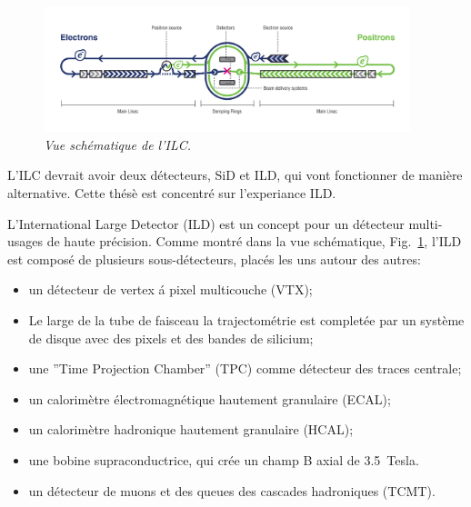 \begin{figure}
	{\centering
		\includegraphics[width=0.95\textwidth]{graphics/ILC_scheme.jpg}
		\caption{\sl Vue sch\'ematique de l'ILC.}
		\label{fig:ILCSchemeF}
	}
\end{figure}

L’ILC devrait avoir deux d\'etecteurs, SiD et ILD, qui vont fonctionner de mani\`ere alternative.%
Cette th\'es\`e est concentr\'e sur l'experiance ILD. 

L'International Large Detector (ILD) est un concept pour un détecteur multi-usages de haute précision.%
Comme montr\'e dans la vue schématique, Fig.~\ref {fig:ILCSchemeF}, l’ILD est compos\'e de plusieurs sous-d\'etecteurs, plac\'es les uns autour des autres:
\begin{itemize}
	\item un d\'etecteur de vertex \'a pixel multicouche (VTX);
	\item Le large de la tube de faisceau la trajectométrie est completée par un système de disque avec des pixels et des bandes de silicium;
	\item une ”Time Projection Chamber” (TPC) comme d\'etecteur des traces centrale;
	\item un calorim\`etre \'electromagn\'etique hautement granulaire (ECAL);
	\item un calorim\`etre hadronique hautement granulaire (HCAL);
	\item une bobine supraconductrice, qui cr\'ee un champ B axial de 3.5~Tesla.
	\item un d\'etecteur de muons et des queues des cascades hadroniques (TCMT).
\end{itemize}

